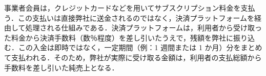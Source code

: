 事業者会員は，クレジットカードなどを用いてサブスクリプション料金を支払う．この支払いは直接弊社に送金されるのではなく，決済プラットフォームを経由して処理される仕組みである．決済プラットフォームは，利用者から受け取った料金から決済手数料（数％程度）を差し引いたうえで，残額を弊社に振り込む．この入金は即時ではなく，一定期間（例：1 週間または 1 か月）分をまとめて支払われる．そのため，弊社が実際に受け取る金額は，利用者の支払総額から手数料を差し引いた純売上となる．







